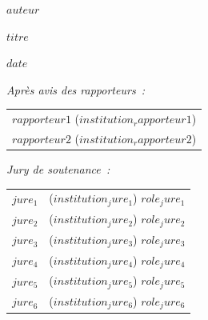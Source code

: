 \documentclass[a4paper,12pt]{reedthesis}
\begin{document}
\begin{center}
{\large\bf $auteur$}
\end{center}

\vspace{3mm}

\begin{center}
{\Large $titre$}
\end{center}


\vspace{10mm}

 $date$

\vspace{5mm}

\noindent
{\small \it Après avis des rapporteurs~:}
\begin{tabular}{l}
{\sc $rapporteur1$} ($institution_rapporteur1$)\vspace{1mm}  \\
{\sc $rapporteur2$} ($institution_rapporteur2$)\\
\end{tabular}

\vspace{8mm}

\noindent
{\small \it Jury de soutenance~:}
\begin{tabular}{ll}
{\sc   $jure_1$}&($institution_jure_1$) {\small $role_jure_1$}\vspace{1mm}\\
{\sc   $jure_2$}&($institution_jure_2$) {\small $role_jure_2$}\vspace{1mm}\\
{\sc   $jure_3$}&($institution_jure_3$) {\small $role_jure_3$}\vspace{1mm}\\
{\sc   $jure_4$}&($institution_jure_4$) {\small $role_jure_4$}\vspace{1mm}\\
{\sc   $jure_5$}&($institution_jure_5$) {\small $role_jure_5$}\vspace{1mm}\\
{\sc   $jure_6$}&($institution_jure_6$) {\small $role_jure_6$}\vspace{1mm}\\
\end{tabular}
\end{document}
